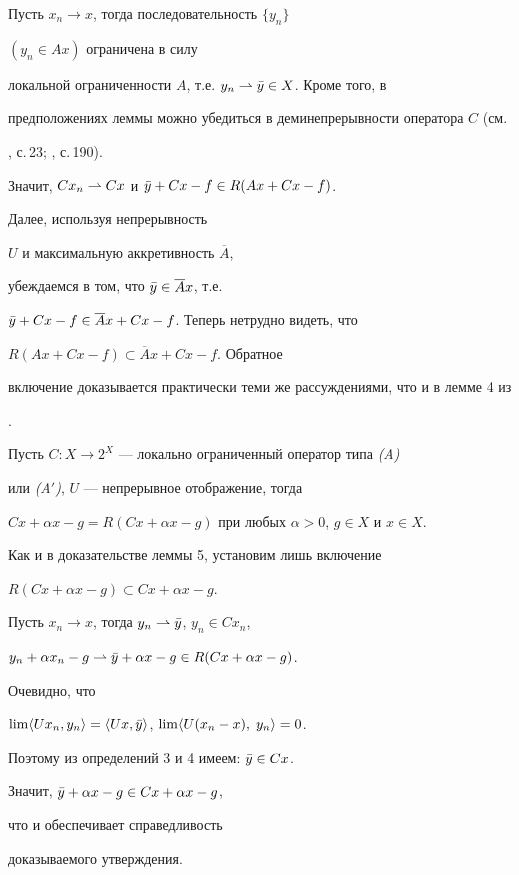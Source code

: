  


\begin{pf} Пусть $x_n\to x$, тогда последовательность $\{y_n\}$ 


$(y_n\in Ax)$ ограничена в силу 


локальной ограниченности $A$, т.е. $y_n\rightharpoonup\Bar y\in X$. Кроме того, в 


предположениях леммы можно убедиться в деминепрерывности оператора $C$ (см. 


\cite{Vai}, с.\,23; \cite{Lio}, с.\,190). 


Значит, $Cx_n\rightharpoonup Cx$ и $\Bar y+Cx-f\in R(Ax+Cx-f)$. 


Далее, используя непрерывность 


$U$ и максимальную аккретивность $\overline A$, 


убеждаемся в том, что $\Bar y\in\overline Ax$, т.е. 


$\Bar y+Cx-f\in\overline Ax+Cx-f$. Теперь нетрудно видеть, что 


$R(Ax+Cx-f)\subset\overline Ax+Cx-f$. Обратное 


включение доказывается практически теми же рассуждениями, что и в лемме 4 из 


\cite{Rya1}. 


\end{pf} 


 


\begin{lem} Пусть $C:X\to 2^X$ --- локально ограниченный оператор типа {\em (A)}


или {\em (A$'$)}, $U$ --- непрерывное отображение, тогда 


$Cx+\alpha x-g=R(Cx+\alpha x-g)$ при любых $\alpha>0$, $g\in X$ и $x\in X$. 


\end{lem}


 


\begin{pf} Как и в доказательстве леммы 5, установим лишь включение 


$R(Cx+\alpha x-g)\subset Cx+\alpha x-g$. 


Пусть $x_n\to x$, тогда $y_n\rightharpoonup\Bar y$, $y_n\in Cx_n$, 


$y_n+\alpha x_n-g\rightharpoonup\Bar y+\alpha x-g\in R(Cx+\alpha x-g)$. 


Очевидно, что 


$\lim\langle Ux_n,y_n\rangle =\langle Ux,\Bar y\rangle$, $\lim\langle U(x_n-x),\;y_n\rangle =0$. 


Поэтому из определений 3 и 4 имеем: $\Bar y\in Cx$. 


Значит, $\Bar y+\alpha x-g\in Cx+\alpha x-g$, 


что и обеспечивает справедливость 


доказываемого утверждения. 


\end{pf} 



